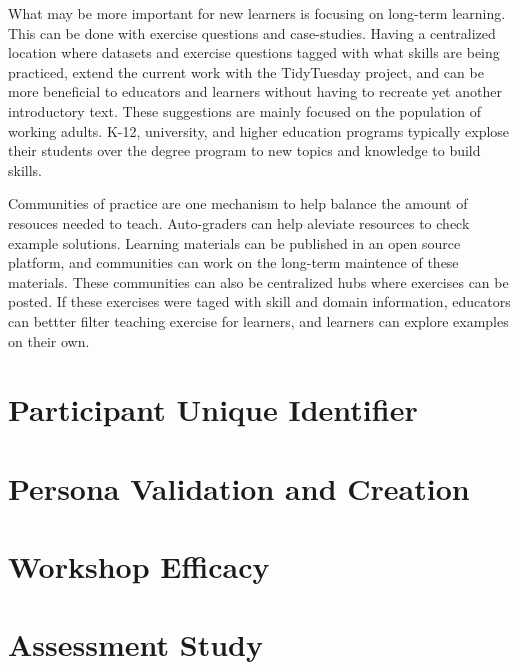 \documentclass[doublespace,draft,nopageskip]{VTthesis} %
\begin{document}
        What may be more important for new learners is focusing on long-term learning.
        This can be done with exercise questions and case-studies.
        Having a centralized location where datasets and exercise questions tagged with what skills are being practiced,
        extend the current work with the TidyTuesday project,
        and can be more beneficial to educators and learners without having to recreate yet another
        introductory text.
        These suggestions are mainly focused on the population of working adults.
        K-12, university, and higher education programs typically explose their students
        over the degree program to new topics and knowledge to build skills.

        Communities of practice are one mechanism to help balance the amount of resouces needed to teach.
        Auto-graders can help aleviate resources to check example solutions.
        Learning materials can be published in an open source platform,
        and communities can work on the long-term maintence of these materials.
        These communities can also be centralized hubs where exercises can be posted.
        If these exercises were taged with skill and domain information,
        educators can bettter filter teaching exercise for learners,
        and learners can explore examples on their own.




	
	

	\appendix

	\begin{appendices}
        \chapter{Participant Unique Identifier} \label{app:participant-id}
            
		\chapter{Persona Validation and Creation} \label{app:persona_validation_creation}
            
		\chapter{Workshop Efficacy} \label{app:workshop_efficacy}
            
        \chapter{Assessment Study} \label{app:exercises}
            
	\end{appendices}
\end{document}
